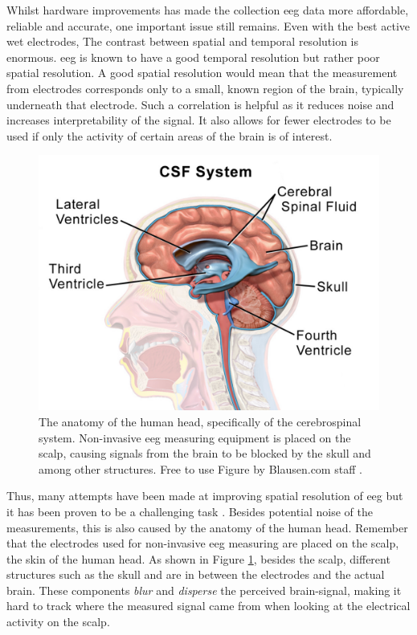 Whilst hardware improvements has made the collection \gls{eeg} data more affordable, reliable and accurate, one important issue still remains.
Even with the best active wet electrodes, The contrast between spatial and temporal resolution is enormous.
\Gls{eeg} is known to have a good temporal resolution but rather poor spatial resolution.
A good spatial resolution would mean that the measurement from electrodes corresponds only to a small, known region of the brain, typically underneath that electrode.
Such a correlation is helpful as it reduces noise and increases interpretability of the signal.
It also allows for fewer electrodes to be used if only the activity of certain areas of the brain is of interest.

\begin{figure}[ht]
    \centering
    \includegraphics[width=0.7\linewidth]{../images/introduction/brain_anatomy.pdf}
    \captionsetup{width=0.7\linewidth}
    \captionsetup{justification=centering}
    \caption{The anatomy of the human head, specifically of the cerebrospinal system. Non-invasive \gls{eeg} measuring equipment is placed on the scalp, causing signals from the brain to be blocked by the skull and  among other structures. Free to use Figure by Blausen.com staff \citep{figure_blausen}.}
    \label{fig:brain_anatomy}
\end{figure}

Thus, many attempts have been made at improving spatial resolution of \gls{eeg} but it has been proven to be a challenging task \citep{spatial_resolution}.
Besides potential noise of the measurements, this is also caused by the anatomy of the human head.
Remember that the electrodes used for non-invasive \gls{eeg} measuring are placed on the scalp, the skin of the human head.
As shown in Figure \ref{fig:brain_anatomy}, besides the scalp, different structures such as the skull and  are in between the electrodes and the actual brain.
These components \textit{blur} and \textit{disperse} the perceived brain-signal, making it hard to track where the measured signal came from when looking at the electrical activity on the scalp.

